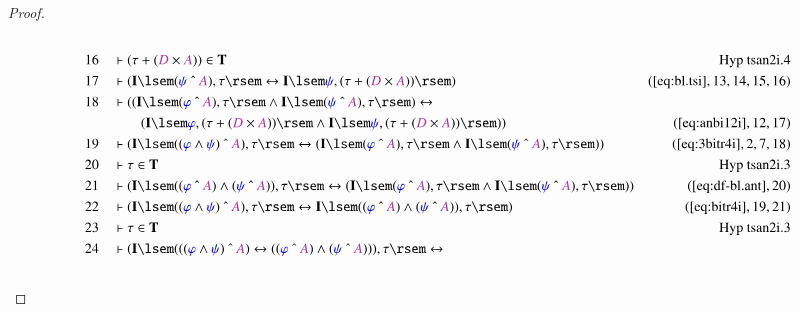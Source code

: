 \begin{proof}
\begin{align}
  \\ 16 &&  & \vdash ( \tau + ( \mc{D} \times \mc{A} ) ) \in
      \mathbf{T}&\text{Hyp~tsan2i.4}\notag%
  \\ 17 &&  & \vdash ( \mathbf{I} \lsem ( \mw{\psi} ~\string^~ \mc{A} ) , \tau
      \rsem \leftrightarrow \mathbf{I} \lsem \mw{\psi} , (
      \tau + ( \mc{D} \times \mc{A} ) ) \rsem
      )&(\mbox{\ref{eq:bl.tsi}},13,14,15,16)\notag
  \\ 18 &&  & \vdash ( ( \mathbf{I} \lsem ( \mw{\varphi} ~\string^~ \mc{A} ) ,
      \tau \rsem \wedge \mathbf{I} \lsem ( \mw{\psi}
      ~\string^~ \mc{A} ) , \tau \rsem ) \leftrightarrow \notag \\ & & & \qquad
      (
      \mathbf{I} \lsem \mw{\varphi} , ( \tau + ( \mc{D}
      \times \mc{A} ) ) \rsem \wedge \mathbf{I} \lsem
      \mw{\psi} , ( \tau + ( \mc{D} \times \mc{A} ) ) \rsem
      ) )&(\mbox{\ref{eq:anbi12i}},12,17)\notag
  \\ 19 &&  & \vdash ( \mathbf{I} \lsem ( ( \mw{\varphi} \wedge \mw{\psi} )
      ~\string^~ \mc{A} ) , \tau \rsem \leftrightarrow (
      \mathbf{I} \lsem ( \mw{\varphi} ~\string^~ \mc{A} ) ,
      \tau \rsem \wedge \mathbf{I} \lsem ( \mw{\psi}
      ~\string^~ \mc{A} ) , \tau \rsem )
      )&(\mbox{\ref{eq:3bitr4i}},2,7,18)\notag
  \\ 20 &&  & \vdash \tau \in \mathbf{T}&\text{Hyp~tsan2i.3}\notag%
  \\ 21 &&  & \vdash ( \mathbf{I} \lsem ( ( \mw{\varphi} ~\string^~ \mc{A} )
      \wedge ( \mw{\psi} ~\string^~ \mc{A} ) ) , \tau \rsem
      \leftrightarrow ( \mathbf{I} \lsem ( \mw{\varphi}
      ~\string^~ \mc{A} ) , \tau \rsem \wedge \mathbf{I}
      \lsem ( \mw{\psi} ~\string^~ \mc{A} ) , \tau \rsem )
      )&(\mbox{\ref{eq:df-bl.ant}},20)\notag
  \\ 22 &&  & \vdash ( \mathbf{I} \lsem ( ( \mw{\varphi} \wedge \mw{\psi} )
      ~\string^~ \mc{A} ) , \tau \rsem \leftrightarrow
      \mathbf{I} \lsem ( ( \mw{\varphi} ~\string^~ \mc{A} )
      \wedge ( \mw{\psi} ~\string^~ \mc{A} ) ) , \tau \rsem
      )&(\mbox{\ref{eq:bitr4i}},19,21)\notag
  \\ 23 &&  & \vdash \tau \in \mathbf{T}&\text{Hyp~tsan2i.3}\notag%
  \\ 24 &&  & \vdash ( \mathbf{I} \lsem ( ( ( \mw{\varphi} \wedge \mw{\psi} )
      ~\string^~ \mc{A} ) \leftrightarrow ( ( \mw{\varphi}
      ~\string^~ \mc{A} ) \wedge ( \mw{\psi} ~\string^~
      \mc{A} ) ) ) , \tau \rsem \leftrightarrow  \notag \\ & & & \qquad

\end{align}
\end{proof}
